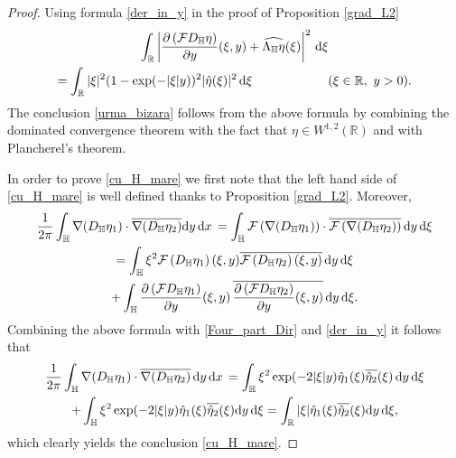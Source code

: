 \documentclass{amsart} %
\numberwithin{equation}{section}
\theoremstyle{definition}
\begin{document}
\begin{proof}
Using formula \eqref{der_in_y} in the proof of Proposition \ref{grad_L2}
\begin{multline}\label{der_in_y_bis}
\int_\mathbb{R}\left|\frac{\partial\left(\mathcal{F} {D_\mathbb{H}} \eta\right)}{\partial y}(\xi,y)+\widehat{\Lambda_\mathbb{H} \eta}(\xi)\right|^2 \, {\rm d}\xi\\
=\int_\mathbb{R}|\xi|^2 (1-\exp(-|\xi|y))^2 |\hat\eta(\xi)|^2 \, {\rm d}\xi \qquad\qquad\qquad(\xi\in \mathbb{R},\ y> 0).
\end{multline}
The conclusion \eqref{urma_bizara} follows from the above formula by combining the dominated convergence theorem with the fact that $\eta\in W^{1,2}(\mathbb{R})$
and with Plancherel's theorem.

In order to prove \eqref{cu_H_mare} we first note that the left hand side of \eqref{cu_H_mare} is well defined thanks to Proposition 
\ref{grad_L2}. Moreover,
\begin{multline*}
\frac{1}{2\pi}\int_\mathbb{H} \nabla(D_\mathbb{H} \eta_1)\cdot \overline{\nabla (D_\mathbb{H} \eta_2)}  {\rm d}y \, {\rm d}x\,= 
\int_\mathbb{H} \mathcal{F}\left(\nabla(D_\mathbb{H} \eta_1)\right)\cdot \overline{\mathcal{F}\left(\nabla (D_\mathbb{H} \eta_2)\right)} \, {\rm d}y\, {\rm d}\xi\\
=\int_\mathbb{H} \xi^2 \mathcal{F} \left({D_\mathbb{H}} \eta_1\right)(\xi,y) \overline{\mathcal{F}\left({D_\mathbb{H}} \eta_2\right)(\xi,y)}\, {\rm d}y \, {\rm d}\xi\\
+\int_\mathbb{H}  \frac{\partial\left(\mathcal{F} {D_\mathbb{H}} \eta_1\right)}{\partial y}(\xi,y) \, 
\overline{\frac{\partial\left(\mathcal{F} {D_\mathbb{H}} \eta_2\right)}{\partial y}(\xi,y)}\, {\rm d}y \, {\rm d}\xi.
\end{multline*}
Combining the above formula with \eqref{Four_part_Dir} and \eqref{der_in_y} it follows that
\begin{multline}\label{cu_H_mare_foarte}
\frac{1}{2\pi}\int_\mathbb{H} \nabla(D_\mathbb{H} \eta_1)\cdot \overline{\nabla (D_\mathbb{H} \eta_2)}  \, {\rm d}y \, {\rm d}x\,
=\int_\mathbb{H} \xi^2 \exp(-2|\xi|y) \hat\eta_1(\xi) \overline{\hat\eta_2}(\xi)\, {\rm d}y \, {\rm d}\xi\\
+\int_\mathbb{H}  \xi^2 \exp(-2|\xi|y) \hat\eta_1(\xi)\overline{\hat \eta_2}(\xi) {\rm d}y \, {\rm d}\xi=
\int_\mathbb{R}  |\xi|  \hat\eta_1(\xi)\overline{\hat \eta_2}(\xi) {\rm d}y \, {\rm d}\xi,
\end{multline}
which clearly yields the conclusion \eqref{cu_H_mare}.
\end{proof}
\end{document}
